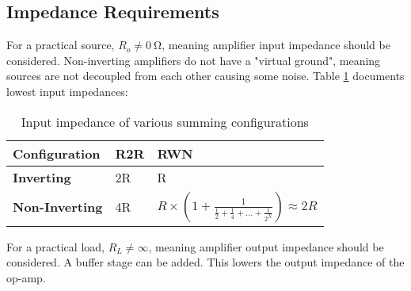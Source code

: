 \subsection{Impedance Requirements}{\label{dac_impedance}}

For a practical source, $R_o \neq \SI{0}{\ohm}$, meaning amplifier input impedance should be considered. Non-inverting amplifiers do not have a "virtual ground",
meaning sources are not decoupled from each other \cite{SummingAmplifierBasics} causing some noise. Table \ref{tab:dac_amplifier_impedance} documents lowest input impedances:

\begin{table}[!h]
  \centering
  \renewcommand{\arraystretch}{1.2}
  \begin{tabular}{ |p{3cm}|p{6cm}|p{6cm}| }
    \hline
    \textbf{Configuration}         & \textbf{R2R}                               & \textbf{RWN}                      \\
    \hline
    \textbf{Inverting}             & 2R                                         & R                                 \\
    \hline
    \textbf{Non-Inverting}         & 4R                                         & $R \times \left(1 + \frac{1}{\frac{1}{2} + \frac{1}{4} + ... + \frac{1}{2^N}}\right) \approx 2R$                              \\
    \hline
  \end{tabular}
  \caption{Input impedance of various summing configurations}
  {\label{tab:dac_amplifier_impedance}}
\end{table}

\noindent For a practical load, $R_L \neq \infty$, meaning amplifier output impedance should be considered.
A buffer stage can be added. This lowers the output impedance of the op-amp.
